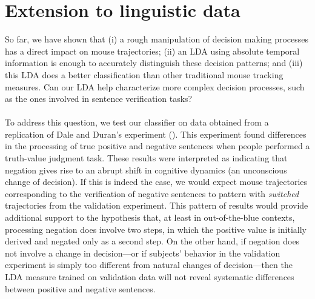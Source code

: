 \documentclass[11pt]{article}
\newcommand{\nbMM}[1]{{\leavevmode\color{green}{\scriptsize#1}}}
\newcommand{\nbEC}[1]{{\leavevmode\color{blue}{\scriptsize#1}}}
\begin{document}
\section{Extension to linguistic data}
\label{section:replication}
So far, we have shown that (i) a rough manipulation of decision making processes has a direct impact on mouse trajectories; (ii) an LDA using absolute temporal information is enough to accurately distinguish these decision patterns; and (iii) this LDA does a better classification than other traditional mouse tracking measures. Can our LDA help characterize more complex decision processes, such as the ones involved in sentence verification tasks? 
\paragraph{}
To address this question, we test our classifier on data obtained from a replication of Dale and Duran's experiment (\citeyear{Dale2011}).   
This experiment found differences in the processing of true positive and negative sentences when people performed a truth-value judgment task. These results were interpreted as indicating that negation gives rise to an abrupt shift in cognitive dynamics (an unconscious change of decision). If this is indeed the case, we would expect mouse trajectories corresponding to the verification of negative sentences to pattern with \emph{switched} trajectories from the validation experiment. This pattern of results would provide additional support to the hypothesis that, at least in out-of-the-blue contexts, processing negation does involve two steps, in which the positive value is initially derived and negated only as a second step.
On the other hand, if negation does not involve a change in decision---or if subjects' behavior in the validation experiment is simply too different from natural changes of decision---then the LDA measure trained on validation data will not reveal systematic differences between positive and negative sentences.
\end{document}
